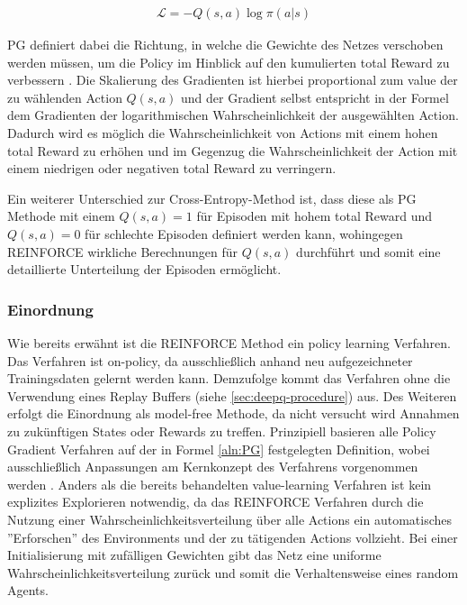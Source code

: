 \documentclass[11pt]{scrartcl}
\begin{document}
\begin{align}
\mathcal{L}=-Q(s,a)\log\pi(a|s)
\label{aln:PG}
\end{align}

PG definiert dabei die Richtung, in welche die Gewichte des Netzes verschoben werden müssen,
um die Policy im Hinblick auf den kumulierten total Reward zu verbessern \cite[~S.244]{L2018}.
Die Skalierung des Gradienten ist hierbei proportional zum value der zu wählenden Action
$Q(s,a)$ und der Gradient selbst entspricht in der Formel dem Gradienten der logarithmischen
Wahrscheinlichkeit der ausgewählten Action. Dadurch wird es möglich die Wahrscheinlichkeit
von Actions mit einem hohen total Reward zu erhöhen und im Gegenzug die Wahrscheinlichkeit
der Action mit einem niedrigen oder negativen total Reward zu verringern.

Ein weiterer Unterschied zur Cross-Entropy-Method ist, dass diese als PG Methode mit einem
$Q(s,a)=1$ für Episoden mit hohem total Reward und $Q(s,a)=0$ für schlechte Episoden
definiert werden kann, wohingegen REINFORCE wirkliche Berechnungen für $Q(s,a)$ durchführt
und somit eine detaillierte Unterteilung der Episoden ermöglicht.

\subsubsection{Einordnung}
Wie bereits erwähnt ist die REINFORCE Method ein policy learning Verfahren. Das Verfahren ist
on-policy, da ausschließlich anhand neu aufgezeichneter Trainingsdaten gelernt werden kann.
Demzufolge kommt das Verfahren ohne die Verwendung eines Replay Buffers (siehe 
\autoref{sec:deepq-procedure}) aus. Des Weiteren erfolgt die Einordnung als model-free Methode,
da nicht versucht wird Annahmen zu zukünftigen States oder Rewards zu treffen. Prinzipiell
basieren alle Policy Gradient Verfahren auf der in Formel \ref{aln:PG} festgelegten Definition,
wobei ausschließlich Anpassungen am Kernkonzept des Verfahrens vorgenommen werden
\cite[~S.244 f.]{L2018}. Anders als die bereits behandelten value-learning Verfahren ist
kein explizites Explorieren notwendig, da das REINFORCE Verfahren durch die Nutzung einer
Wahrscheinlichkeitsverteilung über alle Actions ein automatisches ''Erforschen'' 
des Environments und der zu tätigenden Actions vollzieht. Bei einer Initialisierung mit
zufälligen Gewichten gibt das Netz eine uniforme Wahrscheinlichkeitsverteilung zurück und
somit die Verhaltensweise eines random Agents.
\end{document}
